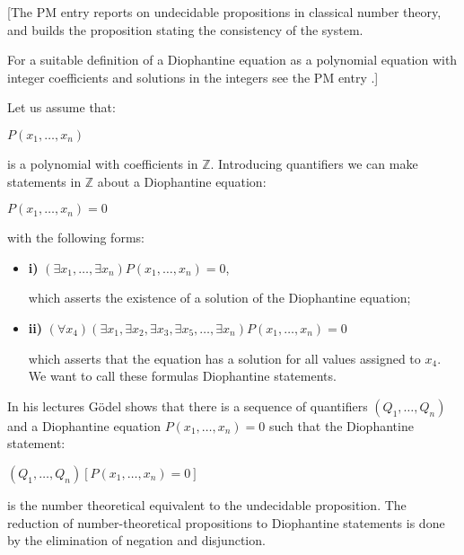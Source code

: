 \documentclass[12pt]{article}
\begin{document}
[The PM entry  reports on undecidable propositions in classical number theory, and builds the proposition stating the consistency of the system.

For a suitable definition of a Diophantine equation as a polynomial equation with integer coefficients and solutions in the integers see the PM entry .]

Let us assume that: 

\begin{center}
$P (x_1, \ldots, x_n)$
\end{center}
 
is a polynomial with coefficients in $\mathbb{Z}$. Introducing quantifiers we can make statements in $\mathbb{Z}$ about a Diophantine equation:

\begin{center}
$P (x_1, \ldots, x_n) = 0$
\end{center}

with the following forms:

\begin{itemize}
\item \textbf{i)} \qquad $(\exists x_1, \ldots, \exists x_n) P (x_1, \ldots, x_n) = 0$,

which asserts the existence of a solution of the Diophantine equation;

\item \textbf{ii)} \qquad $(\forall x_4) (\exists x_1, \exists x_2, \exists x_3, \exists x_5, \ldots, \exists x_n) P (x_1, \ldots, x_n) = 0$

which asserts that the equation has a solution for all values assigned to $x_4$. We want to call these formulas Diophantine statements.
\end{itemize}

In his lectures G\"{o}del shows that there is a sequence of quantifiers $(Q_1, \ldots, Q_n)$ and a Diophantine equation $P (x_1, \ldots, x_n) = 0$ such that the Diophantine statement:

\begin{center}
$(Q_1, \ldots, Q_n) [P (x_1, \ldots, x_n) = 0]$
\end{center}

is the number theoretical equivalent to the undecidable proposition. The reduction of number-theoretical propositions to Diophantine statements is done by the elimination of negation and disjunction.
\end{document}
